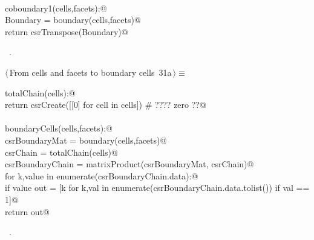 \documentclass[11pt,oneside]{article}	%
\begin{document}
\begin{flushleft}
\begin{list}{}{}
\mbox{}\verb@@\\
\mbox{}\verb@def coboundary1(cells,facets):@\\
\mbox{}\verb@   Boundary = boundary(cells,facets)@\\
\mbox{}\verb@   return csrTranspose(Boundary)@\\
\mbox{}\verb@@{\NWsep}
\end{list}
\vspace{-1ex}
\footnotesize\addtolength{\baselineskip}{-1ex}
\begin{list}{}{\setlength{\itemsep}{-\parsep}\setlength{\itemindent}{-\leftmargin}}
\item \NWtxtMacroRefIn\ .
\end{list}
\end{flushleft}
\begin{flushleft} \small \label{scrap50}
\protect{}$\langle\,$From cells and facets to boundary cells\nobreak\ {\footnotesize 31a}$\,\rangle\equiv$
\vspace{-1ex}
\begin{list}{}{} \item
\mbox{}\verb@def totalChain(cells):@\\
\mbox{}\verb@   return csrCreate([[0] for cell in cells])  # ????  zero ??@\\
\mbox{}\verb@@\\
\mbox{}\verb@def boundaryCells(cells,facets):@\\
\mbox{}\verb@   csrBoundaryMat = boundary(cells,facets)@\\
\mbox{}\verb@   csrChain = totalChain(cells)@\\
\mbox{}\verb@   csrBoundaryChain = matrixProduct(csrBoundaryMat, csrChain)@\\
\mbox{}\verb@   for k,value in enumerate(csrBoundaryChain.data):@\\
\mbox{}\verb@      if value % 2 == 0: csrBoundaryChain.data[k] = 0@\\
\mbox{}\verb@   out = [k for k,val in enumerate(csrBoundaryChain.data.tolist()) if val == 1]@\\
\mbox{}\verb@   return out@\\
\mbox{}\verb@@{\NWsep}
\end{list}
\vspace{-1ex}
\footnotesize\addtolength{\baselineskip}{-1ex}
\begin{list}{}{\setlength{\itemsep}{-\parsep}\setlength{\itemindent}{-\leftmargin}}
\item \NWtxtMacroRefIn\ .
\end{list}
\end{flushleft}
\end{document}
